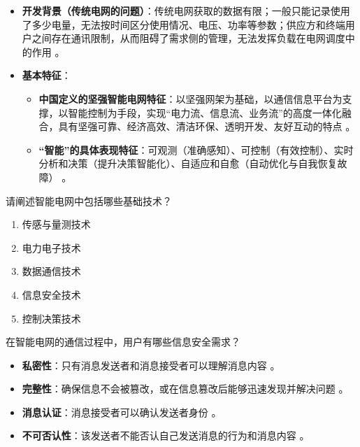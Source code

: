 \begin{solution}
\begin{itemize}
\item \textbf{开发背景（传统电网的问题）}：传统电网获取的数据有限；一般只能记录使用了多少电量，无法按时间区分使用情况、电压、功率等参数；供应方和终端用户之间存在通讯限制，从而阻碍了需求侧的管理，无法发挥负载在电网调度中的作用 。
\item \textbf{基本特征}：
\begin{itemize}
\item \textbf{中国定义的坚强智能电网特征}：以坚强网架为基础，以通信信息平台为支撑，以智能控制为手段，实现“电力流、信息流、业务流”的高度一体化融合，具有坚强可靠、经济高效、清洁环保、透明开发、友好互动的特点 。
\item \textbf{“智能”的具体表现特征}：可观测（准确感知）、可控制（有效控制）、实时分析和决策（提升决策智能化）、自适应和自愈（自动优化与自我恢复故障） 。
\end{itemize}
\end{itemize}
\end{solution}

\begin{problem}\label{exer:think_03_wind_12}
请阐述智能电网中包括哪些基础技术？
\end{problem}

\begin{solution}
\begin{enumerate}
\item 传感与量测技术
\item 电力电子技术
\item 数据通信技术
\item 信息安全技术
\item 控制决策技术
\end{enumerate}
\end{solution}

\begin{problem}\label{exer:think_03_wind_13}
在智能电网的通信过程中，用户有哪些信息安全需求？
\end{problem}

\begin{solution}
\begin{itemize}
\item \textbf{私密性}：只有消息发送者和消息接受者可以理解消息内容 。
\item \textbf{完整性}：确保信息不会被篡改，或在信息篡改后能够迅速发现并解决问题 。
\item \textbf{消息认证}：消息接受者可以确认发送者身份 。
\item \textbf{不可否认性}：该发送者不能否认自己发送消息的行为和消息内容 。
\end{itemize}
\end{solution}

